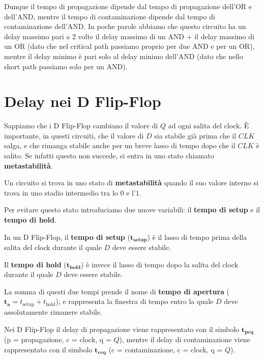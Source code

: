 \documentclass[11pt, a4paper, titlepage, oneside]{scrbook}
\begin{document}
Dunque il tempo di propagazione dipende dal tempo di propagazione dell'OR e dell'AND, mentre il tempo di contaminazione dipende dal tempo di contaminazione dell'AND. In poche parole abbiamo che questo circuito ha un delay massimo pari a 2 volte il delay massimo di un AND + il delay massimo di un OR (dato che nel critical path passiamo proprio per due AND e per un OR), mentre il delay minimo è pari solo al delay minimo dell'AND (dato che nello short path passiamo solo per un AND).

\section{Delay nei D Flip-Flop}

Sappiamo che i D Flip-Flop cambiano il valore di $Q$ ad ogni salita del clock. È importante, in questi circuiti, che il valore di $D$ sia stabile già prima che il $CLK$ salga, e che rimanga stabile anche per un breve lasso di tempo dopo che il $CLK$ è salito. Se infatti questo non succede, si entra in uno stato chiamato \textbf{metastabilità}.

\begin{Definizione}[Metastabilità]
\label{def-metastabilita}
Un circuito si trova in uno stato di \textbf{metastabilità} quando il suo valore interno si trova in uno stadio intermedio tra lo $0$ e l'$1$.
\end{Definizione}

Per evitare questo stato introduciamo due nuove variabili: il \textbf{tempo di setup} e il \textbf{tempo di hold}.

\begin{Definizione}
\label{def-setup-hold}
In un D Flip-Flop, il \textbf{tempo di setup} ($\bm{t_{\textbf{setup}}}$) è il lasso di tempo prima della salita del clock durante il quale $D$ deve essere stabile.

Il \textbf{tempo di hold} ($\bm{t_{\textbf{hold}}}$) è invece il lasso di tempo dopo la salita del clock durante il quale $D$ deve essere stabile.

La somma di questi due tempi prende il nome di \textbf{tempo di apertura} ($\bm{t_a} = t_{\text{setup}} + t_{\text{hold}}$), e rappresenta la finestra di tempo entro la quale $D$ deve assolutamente rimanere stabile.
\end{Definizione}

\NB Nei D Flip-Flop il delay di propagazione viene rappresentato con il simbolo $\bm{t_{pcq}}$ (p = propagazione, c = clock, q = $Q$), mentre il delay di contaminazione viene rappresentato con il simbolo $\bm{t_{ccq}}$ (c = contaminazione, c = clock, q = $Q$).
\end{document}
